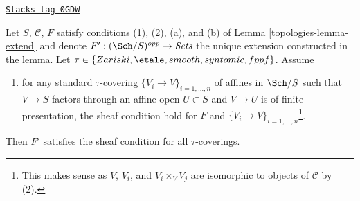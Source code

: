 \begin{lemma}
\label{topologies-lemma-extend-sheaf-general}
\href{https://stacks.math.columbia.edu/tag/0GDW}{\texttt{Stacks tag 0GDW}}

Let $S$, $\mathcal{C}$, $F$ satisfy conditions (1), (2), (a), and (b) of
Lemma \ref{topologies-lemma-extend} and denote $F' : (\Sch/S)^{opp} \to \textit{Sets}$
the unique extension constructed in the lemma. Let
$\tau \in \{Zariski, \etale, smooth, syntomic, fppf\}$. Assume
\begin{enumerate}
\item[(c)] for any standard $\tau$-covering $\{V_i \to V\}_{i = 1, \ldots, n}$
of affines in $\Sch/S$ such that $V \to S$ factors through an affine open
$U \subset S$ and $V \to U$ is of finite presentation, the sheaf condition
hold for $F$ and $\{V_i \to V\}_{i = 1, \ldots, n}$\footnote{This makes
sense as $V$, $V_i$, and $V_i \times_V V_j$ are isomorphic to objects
of $\mathcal{C}$ by (2).}.
\end{enumerate}
Then $F'$ satisfies the sheaf condition for all $\tau$-coverings.
\end{lemma}

